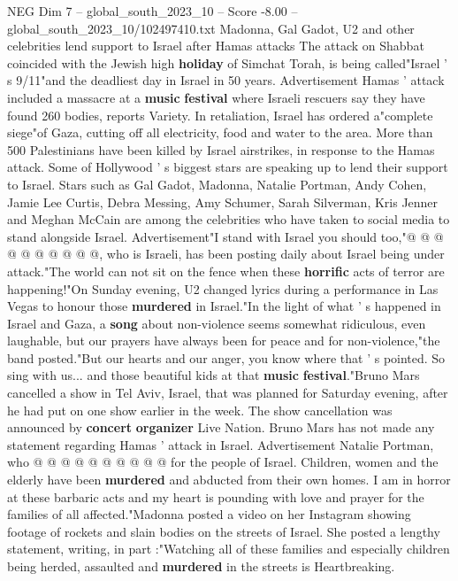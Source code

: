 \begin{textsample}{NEG Dim 7 – global\_south\_2023\_10 – Score -8.00 – global\_south\_2023\_10/102497410.txt}  \label{ex:f7_neg_320}
Madonna, Gal Gadot, U2 and other celebrities lend support to Israel after Hamas attacks The attack on Shabbat coincided with the Jewish high \textbf{holiday} of Simchat Torah, is being called"Israel ' s 9/11"and the deadliest day in Israel in 50 years.
Advertisement Hamas ' attack included a massacre at a \textbf{music} \textbf{festival} where Israeli rescuers say they have found 260 bodies, reports Variety.
In retaliation, Israel has ordered a"complete siege"of Gaza, cutting off all electricity, food and water to the area.
More than 500 Palestinians have been killed by Israel airstrikes, in response to the Hamas attack.
Some of Hollywood ' s biggest stars are speaking up to lend their support to Israel.
Stars such as Gal Gadot, Madonna, Natalie Portman, Andy Cohen, Jamie Lee Curtis, Debra Messing, Amy Schumer, Sarah Silverman, Kris Jenner and Meghan McCain are among the celebrities who have taken to social media to stand alongside Israel.
Advertisement"I stand with Israel you should too,"@ @ @ @ @ @ @ @ @ @, who is Israeli, has been posting daily about Israel being under attack."The world can not sit on the fence when these \textbf{horrific} acts of terror are happening!"On Sunday evening, U2 changed lyrics during a performance in Las Vegas to honour those \textbf{murdered} in Israel."In the light of what ' s happened in Israel and Gaza, a \textbf{song} about non-violence seems somewhat ridiculous, even laughable, but our prayers have always been for peace and for non-violence,"the band posted."But our hearts and our anger, you know where that ' s pointed.
So sing with us... and those beautiful kids at that \textbf{music} \textbf{festival}."Bruno Mars cancelled a show in Tel Aviv, Israel, that was planned for Saturday evening, after he had put on one show earlier in the week.
The show cancellation was announced by \textbf{concert} \textbf{organizer} Live Nation.
Bruno Mars has not made any statement regarding Hamas ' attack in Israel.
Advertisement Natalie Portman, who @ @ @ @ @ @ @ @ @ @ for the people of Israel.
Children, women and the elderly have been \textbf{murdered} and abducted from their own homes.
I am in horror at these barbaric acts and my heart is pounding with love and prayer for the families of all affected."Madonna posted a video on her Instagram showing footage of rockets and slain bodies on the streets of Israel.
She posted a lengthy statement, writing, in part :"Watching all of these families and especially children being herded, assaulted and \textbf{murdered} in the streets is Heartbreaking.

\end{textsample}
